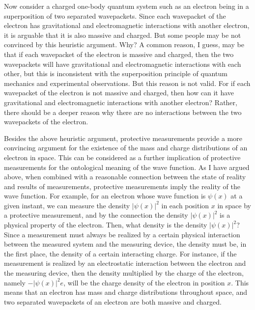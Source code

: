 Now consider a charged one-body quantum system such as an electron being in a superposition of two separated wavepackets. 
Since each wavepacket of the electron has gravitational and electromagnetic interactions with another electron, it is arguable that it is also massive and charged. 
But some people may be not convinced by this heuristic argument. Why?
A common reason, I guess, may be that if each wavepacket of the electron is massive and charged, then the two wavepackets will have gravitational and electromagnetic interactions with each other, but this is inconsistent with the superposition principle of quantum mechanics and experimental observations. But this reason is not valid. For if each wavepacket of the electron is not massive and charged, then how can it have gravitational and electromagnetic interactions with another electron? Rather, there should be a deeper reason why there are no interactions between the two wavepackets of the electron.

Besides the above heuristic argument, protective measurements provide a more convincing argument for the existence of the mass and charge distributions of an electron in space.
This can be considered as a further implication of protective measurements for the ontological meaning of the wave function.
As I have argued above, when combined with a reasonable connection between the state of reality and results of measurements, protective measurements imply the reality of the wave function.
For example, for an electron whose wave function is $\psi(x)$ at a given instant, we can measure the density $|\psi(x)|^2$ in each position $x$ in space by a protective measurement, and by the connection the density $|\psi(x)|^2$ is a physical property of the electron. Then, what density is the density $|\psi(x)|^2$?
Since a measurement must always be realized by a certain physical interaction between the measured system and the measuring device, the density must be, in the first place, the density of a certain interacting charge. For instance, if the measurement is realized by an electrostatic interaction between the electron and the measuring device, then the density multiplied by the charge of the electron, namely $-|\psi(x)|^2e$, will be the charge density of the electron in position $x$. This means that an electron has mass and charge distributions throughout space, and two separated wavepackets of an electron are both massive and charged.%

